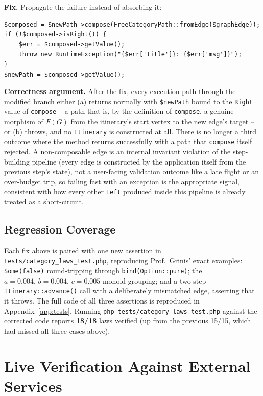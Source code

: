 \documentclass[a4paper,12pt,fleqn]{article}
\begin{document}
\textbf{Fix.} Propagate the failure instead of absorbing it:
\begin{lstlisting}[caption={Fixed \texttt{Itinerary::advance} -- Left fails the computation}]
$composed = $newPath->compose(FreeCategoryPath::fromEdge($graphEdge));
if (!$composed->isRight()) {
    $err = $composed->getValue();
    throw new RuntimeException("{$err['title']}: {$err['msg']}");
}
$newPath = $composed->getValue();
\end{lstlisting}

\textbf{Correctness argument.} After the fix, every execution path through the modified branch either (a) returns normally with \texttt{\$newPath} bound to the \texttt{Right} value of \texttt{compose} -- a path that is, by the definition of \texttt{compose}, a genuine morphism of $F(G)$ from the itinerary's start vertex to the new edge's target -- or (b) throws, and no \texttt{Itinerary} is constructed at all. There is no longer a third outcome where the method returns successfully with a path that \texttt{compose} itself rejected. A non-composable edge is an internal invariant violation of the step-building pipeline (every edge is constructed by the application itself from the previous step's state), not a user-facing validation outcome like a late flight or an over-budget trip, so failing fast with an exception is the appropriate signal, consistent with how every other \texttt{Left} produced inside this pipeline is already treated as a short-circuit.

\subsection{Regression Coverage}\label{sec:coverage}

Each fix above is paired with one new assertion in \texttt{tests/category\_laws\_test.php}, reproducing Prof.~Grinis' exact examples: \texttt{Some(false)} round-tripping through \texttt{bind(Option::pure)}; the $a=0.004,\,b=0.004,\,c=0.005$ monoid grouping; and a two-step \texttt{Itinerary::advance()} call with a deliberately mismatched edge, asserting that it throws. The full code of all three assertions is reproduced in Appendix~\ref{app:tests}. Running \texttt{php tests/category\_laws\_test.php} against the corrected code reports \textbf{18/18} laws verified (up from the previous 15/15, which had missed all three cases above).

\newpage
\section{Live Verification Against External Services}\label{sec:verification}

\end{document}
